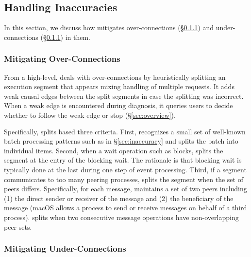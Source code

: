 \subsection{Handling Inaccuracies}

In this section, 
we discuss how \xxx mitigates
over-connections (\S\ref{subsec:fix-over}) and under-connections
(\S\ref{subsec:fix-over}) in them.

\subsubsection{Mitigating Over-Connections}\label{subsec:fix-over}

From a high-level, \xxx deals with over-connections by heuristically
splitting an execution segment that appears mixing handling of multiple
requests. It adds weak causal edges between the split segments in case
the splitting was incorrect. When a weak edge is encountered during
diagnosis, it queries users to decide whether to follow the weak edge
or stop (\S\ref{sec:overview}).

Specifically, \xxx splits based three criteria.  First, \xxx recognizes a
small set of well-known batch processing patterns such as
 in \S\ref{sec:inaccuracy} and splits the
batch into individual items.  Second, when a wait operation such as
 blocks, \xxx splits the segment at the entry of the blocking
wait.  The rationale is that blocking wait is typically done at the last
during one step of event processing.  Third, if a segment communicates to
too many peering processes, \xxx splits the segment when the set of peers
differs.  Specifically, for each message, \xxx maintains a set of two
peers including (1) the direct sender or receiver of the message and (2)
the beneficiary of the message (macOS allows a process to send or receive
messages on behalf of a third process).  \xxx splits when two consecutive
message operations have non-overlapping peer sets.

\subsubsection{Mitigating Under-Connections}\label{subsec:fix-under}

